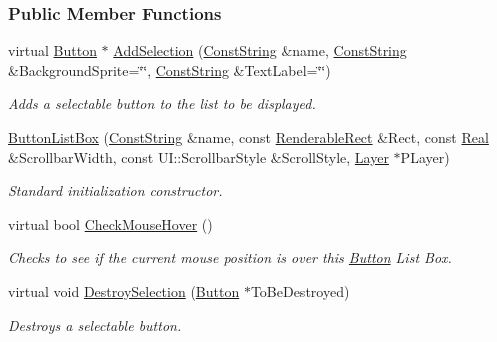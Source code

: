 \subsubsection*{Public Member Functions}
\begin{DoxyCompactItemize}
\item 
virtual \hyperlink{classphys_1_1UI_1_1Button}{Button} $\ast$ \hyperlink{classphys_1_1UI_1_1ButtonListBox_afc976097cd2b1a039882e07272f9a464}{AddSelection} (\hyperlink{namespacephys_a5ce5049f8b4bf88d6413c47b504ebb31}{ConstString} \&name, \hyperlink{namespacephys_a5ce5049f8b4bf88d6413c47b504ebb31}{ConstString} \&BackgroundSprite=\char`\"{}\char`\"{}, \hyperlink{namespacephys_a5ce5049f8b4bf88d6413c47b504ebb31}{ConstString} \&TextLabel=\char`\"{}\char`\"{})
\begin{DoxyCompactList}\small\item\em Adds a selectable button to the list to be displayed. \item\end{DoxyCompactList}\item 
\hyperlink{classphys_1_1UI_1_1ButtonListBox_a43ac98232280969a8ce2641d36658808}{ButtonListBox} (\hyperlink{namespacephys_a5ce5049f8b4bf88d6413c47b504ebb31}{ConstString} \&name, const \hyperlink{structphys_1_1UI_1_1RenderableRect}{RenderableRect} \&Rect, const \hyperlink{namespacephys_af7eb897198d265b8e868f45240230d5f}{Real} \&ScrollbarWidth, const UI::ScrollbarStyle \&ScrollStyle, \hyperlink{classphys_1_1UI_1_1Layer}{Layer} $\ast$PLayer)
\begin{DoxyCompactList}\small\item\em Standard initialization constructor. \item\end{DoxyCompactList}\item 
virtual bool \hyperlink{classphys_1_1UI_1_1ButtonListBox_aaa8b11b174a0475cadee3d3349ef1a58}{CheckMouseHover} ()
\begin{DoxyCompactList}\small\item\em Checks to see if the current mouse position is over this \hyperlink{classphys_1_1UI_1_1Button}{Button} List Box. \item\end{DoxyCompactList}\item 
virtual void \hyperlink{classphys_1_1UI_1_1ButtonListBox_a4ac91d2219d9fa471976bd482dc909b4}{DestroySelection} (\hyperlink{classphys_1_1UI_1_1Button}{Button} $\ast$ToBeDestroyed)
\begin{DoxyCompactList}\small\item\em Destroys a selectable button. \item\end{DoxyCompactList}\item 

\end{DoxyCompactItemize}
